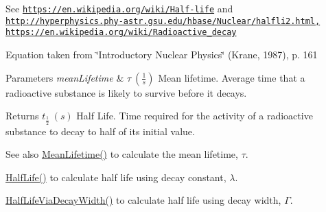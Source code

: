 See \href{https://en.wikipedia.org/wiki/Half-life}{\tt https\+://en.\+wikipedia.\+org/wiki/\+Half-\/life} and \href{http://hyperphysics.phy-astr.gsu.edu/hbase/Nuclear/halfli2.html,}{\tt http\+://hyperphysics.\+phy-\/astr.\+gsu.\+edu/hbase/\+Nuclear/halfli2.\+html,} \href{https://en.wikipedia.org/wiki/Radioactive_decay}{\tt https\+://en.\+wikipedia.\+org/wiki/\+Radioactive\+\_\+decay}

Equation taken from \char`\"{}\+Introductory Nuclear Physics\char`\"{} (Krane, 1987), p. 161


\begin{DoxyParams}{Parameters}
{\em mean\+Lifetime} & $\tau\ (\frac{1}{s})$ Mean lifetime. Average time that a radioactive substance is likely to survive before it decays. \\
\hline
\end{DoxyParams}
\begin{DoxyReturn}{Returns}
$t_{\frac{1}{2}}\ (s)$ Half Life. Time required for the activity of a radioactive substance to decay to half of its initial value. 
\end{DoxyReturn}
\begin{DoxySeeAlso}{See also}
\hyperlink{group___atomic_gaa9e3c2deedda4bc7a745568b06fc47eb}{Mean\+Lifetime()} to calculate the mean lifetime, $\tau$. 

\hyperlink{group___half_life_ga21d268f154fb91c1c556bbfa7fe83ac1}{Half\+Life()} to calculate half life using decay constant, $\lambda$. 

\hyperlink{group___half_life_gaba3fda944d1a68ee1016a1f2f5809359}{Half\+Life\+Via\+Decay\+Width()} to calculate half life using decay width, $\Gamma$. 
\end{DoxySeeAlso}
